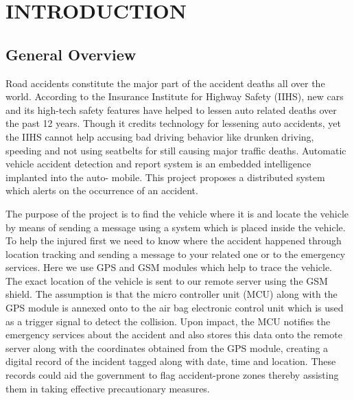 
\chapter{INTRODUCTION} %
\section{General Overview} %
Road accidents constitute the major part of the accident deaths all over the world. According to the Insurance Institute for Highway Safety (IIHS), new cars and its high-tech safety features have helped to lessen auto related deaths over the past 12 years. Though it credits technology for lessening auto accidents, yet the IIHS cannot help accusing bad driving behavior like drunken driving, speeding and not using seatbelts for still causing major traffic deaths. Automatic vehicle accident detection and report system is an embedded intelligence implanted into the auto- mobile. This project proposes a distributed system which alerts on the occurrence of an accident.

The purpose of the project is to find the vehicle where it is and locate the vehicle by means of sending a message using a system which is placed inside the vehicle. To help the injured first we need to know where the accident happened through location tracking and sending a message to your related one or to the emergency services. Here we use GPS and GSM modules which help to trace the vehicle. The exact location of the vehicle is sent to our remote server using the GSM shield. The assumption is that the micro controller unit (MCU) along with the GPS module is annexed onto to the air bag electronic control unit which is used as a trigger signal to detect the collision. Upon impact, the MCU notifies the emergency services about the accident and also stores this data onto the remote server along with the coordinates obtained from the GPS module, creating a digital record of the incident tagged along with date, time and location. These records could aid the government to flag accident-prone zones thereby assisting them in taking effective precautionary measures. 


